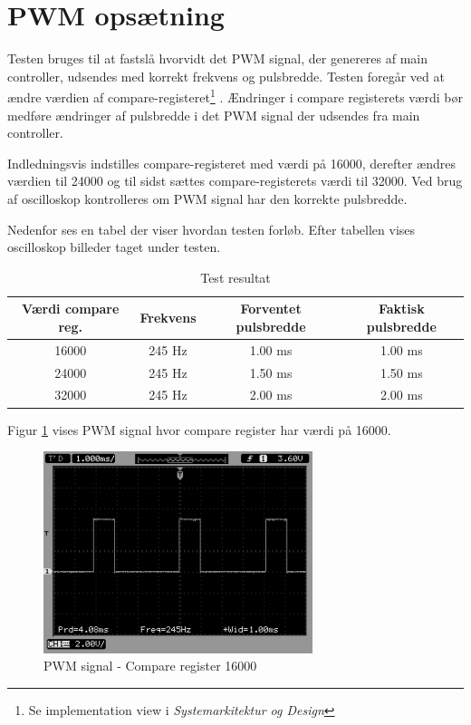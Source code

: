 \section{PWM opsætning}

Testen bruges til at fastslå hvorvidt det PWM signal, der genereres af main controller, udsendes med korrekt frekvens og pulsbredde. Testen foregår ved at ændre værdien af compare-registeret\footnote{Se implementation view i \textit{Systemarkitektur og Design}} . Ændringer i compare registerets værdi bør medføre ændringer af pulsbredde i det PWM signal der udsendes fra main controller. 

Indledningsvis indstilles compare-registeret med værdi på 16000, derefter ændres værdien til 24000 og til sidst sættes compare-registerets værdi til 32000. Ved brug af oscilloskop kontrolleres om PWM signal har den korrekte pulsbredde. 

Nedenfor ses en tabel der viser hvordan testen forløb. Efter tabellen vises oscilloskop billeder taget under testen. 

\vspace{0.50cm}

\begin{table}[H]
	\centering
		\begin{tabular}{|c|c|c|c|}
			\hline
			Værdi compare reg. & Frekvens & Forventet pulsbredde & Faktisk pulsbredde \\ \hline
			16000 & 245 Hz & 1.00 ms & 1.00 ms \\ \hline			
			24000 & 245 Hz & 1.50 ms & 1.50 ms \\ \hline
			32000 & 245 Hz & 2.00 ms & 2.00 ms \\ \hline
		\end{tabular}
	\caption{Test resultat}
\end{table}

\vspace{0.50cm}

Figur \ref{fig:PWM_1} vises PWM signal hvor compare register har værdi på 16000. 

\begin{figure}[H]
\centering
\includegraphics[width=0.7\textwidth]{Billeder/Test/PWM_16000.png}
\vspace{-0.0cm}
\caption{PWM signal - Compare register 16000}
\label{fig:PWM_1}
\end{figure}

